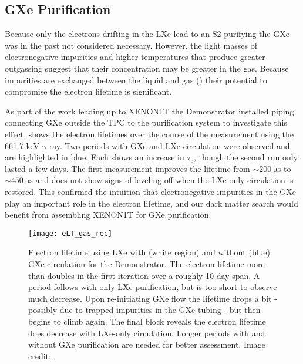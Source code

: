 \subsection{GXe Purification}
\label{subsec:electron_lifetime_model_gxe}
Because only the electrons drifting in the LXe lead to an S2 purifying the GXe was in the past not considered necessary.  However,
the light masses of electronegative impurities and higher temperatures that produce greater outgassing
suggest that their concentration may be greater in the gas.  Because
impurities are exchanged between the liquid and gas () their potential to compromise
the electron lifetime is significant.

As part of the work leading up to XENON1T the Demonstrator installed piping connecting GXe outside the TPC to the
purification system to investigate this effect.   shows the electron lifetimes over
the course of the measurement using the 661.7 keV  $\gamma$-ray.  Two periods with GXe and LXe circulation were observed and
are highlighted in blue.  Each shows an increase in
$\tau_e$, though the second run only lasted a few days.  The first measurement improves the lifetime from
${\sim} 200\ \mathrm{\mu s}$ to ${\sim} 450\ \mathrm{\mu s}$ and does not show signs of leveling off when the LXe-only circulation is
restored.  This confirmed the intuition that electronegative impurities in the GXe play an important role in the electron
lifetime, and our dark matter search would benefit from assembling XENON1T for GXe purification.

\begin{figure}
\centering
\texttt{[image: eLT\_gas\_rec]}
\caption[Electron lifetime using LXe with and without GXe circulation for the Demonstrator.]{Electron lifetime using LXe with (white region)
and without (blue) GXe circulation for the Demonstrator.  The electron lifetime
more than doubles in the first iteration over a roughly 10-day span.  A period follows with
only LXe purification, but is too short to observe much decrease.  Upon re-initiating GXe flow the lifetime drops a bit - possibly due to
trapped impurities in the GXe tubing - but then begins to climb again.  The final block reveals the electron lifetime does
decrease with LXe-only circulation.  Longer periods with and without GXe purification are needed for better assessment.  Image credit:
.}
\label{fig:electron_lifetime_model_gxe_demonstrator}
\end{figure}

